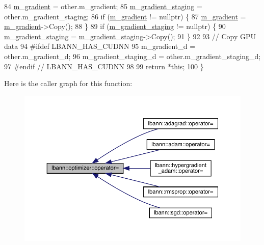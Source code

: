 \begin{DoxyCode}
84   \hyperlink{classlbann_1_1optimizer_a3df20cb0ae2b60430ad4fd235d66c12e}{m\_gradient} = other.m\_gradient;
85   \hyperlink{classlbann_1_1optimizer_a92cd058d4f9fc8162d36d52461a96df2}{m\_gradient\_staging} = other.m\_gradient\_staging;
86   \textcolor{keywordflow}{if} (\hyperlink{classlbann_1_1optimizer_a3df20cb0ae2b60430ad4fd235d66c12e}{m\_gradient} != \textcolor{keyword}{nullptr}) \{
87     \hyperlink{classlbann_1_1optimizer_a3df20cb0ae2b60430ad4fd235d66c12e}{m\_gradient} = \hyperlink{classlbann_1_1optimizer_a3df20cb0ae2b60430ad4fd235d66c12e}{m\_gradient}->Copy();
88   \}
89   \textcolor{keywordflow}{if} (\hyperlink{classlbann_1_1optimizer_a92cd058d4f9fc8162d36d52461a96df2}{m\_gradient\_staging} != \textcolor{keyword}{nullptr}) \{
90     \hyperlink{classlbann_1_1optimizer_a92cd058d4f9fc8162d36d52461a96df2}{m\_gradient\_staging} = \hyperlink{classlbann_1_1optimizer_a92cd058d4f9fc8162d36d52461a96df2}{m\_gradient\_staging}->Copy();
91   \}
92 
93   \textcolor{comment}{// Copy GPU data}
94 \textcolor{preprocessor}{  #ifdef LBANN\_HAS\_CUDNN}
95   m\_gradient\_d = other.m\_gradient\_d;
96   m\_gradient\_staging\_d = other.m\_gradient\_staging\_d;
97 \textcolor{preprocessor}{  #endif // LBANN\_HAS\_CUDNN}
98 
99   \textcolor{keywordflow}{return} *\textcolor{keyword}{this};
100 \}
\end{DoxyCode}
Here is the caller graph for this function\+:\nopagebreak
\begin{figure}[H]
\begin{center}
\leavevmode
\includegraphics[width=350pt]{classlbann_1_1optimizer_ab7811e0a4d2d9b594140aed78b6de743_icgraph}
\end{center}
\end{figure}
\mbox{\label{classlbann_1_1optimizer_a68ba7515d7eb4af38ff19607c13a111b}} 
